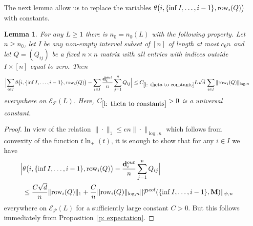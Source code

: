 \documentclass[12pt]{article}
\newtheorem{lemma}[theorem]{Lemma}
\theoremstyle{definition}
\theoremstyle{plain}
\newcommand{\Event}{\mathcal{E}}
\def\ranmtx{{\bf{}M}}
\def\OutDeg{{\bf d}^{out}}
\def\Row{{\rm row}}
\def\pvector{{\mathcal P}}
\begin{document}
The next lemma allow us to replace the variables $\theta\big(i,\{\inf I,\dots, i-1\},\Row_i(Q)\big)$
with constants.
\begin{lemma}\label{l: theta to constants}
For any $L\geq 1$ there is $n_0=n_0(L)$ with the following property.
Let $n\geq n_0$,
let $I$ be any non-empty interval subset of $[n]$ of length at most $c_0 n$ and let $Q=(Q_{ij})$ be a fixed $n\times n$
matrix with all entries with indices outside $I\times[n]$ equal to zero.
Then
\begin{align*}
\Big|\sum_{i\in I}\theta\big(i,\{\inf I,\dots, i-1\},\Row_i(Q)\big)
-\sum_{i\in I}\frac{\OutDeg_{i}}{n}\sum_{j=1}^n Q_{ij}\Big|
\leq C_{\ref{l: theta to constants}}L\sqrt{d}\,
\sum_{i\in I}\|\Row_i(Q)\|_{\log,n}
\end{align*}
everywhere on $\Event_\pvector(L)$. Here, $C_{\ref{l: theta to constants}}>0$ is a universal constant.
\end{lemma}
\begin{proof}
In view of the relation $\|\cdot\|_1\leq en\|\cdot\|_{\log,n}$ which follows from convexity of the function $t\ln_+(t)$,
it is enough to show that for any $i\in I$ we have
\begin{align*}
\Big|&\theta\big(i,\{\inf I,\dots, i-1\},\Row_i(Q)\big)
-\frac{\OutDeg_{i}}{n}\sum_{j=1}^n Q_{ij}\Big|\\
&\leq \frac{C \sqrt{d}}{n}\|\Row_i(Q)\|_1+\frac{C}{n}
\|\Row_i(Q)\|_{\log,n}\|\pvector^{col}(\{\inf I,\dots,i-1\},\ranmtx)\|_{\psi,n}
\end{align*}
everywhere on $\Event_\pvector(L)$ for a sufficiently large constant $C>0$.
But this follows immediately from Proposition~\ref{p: expectation}.
\end{proof}
\end{document}
